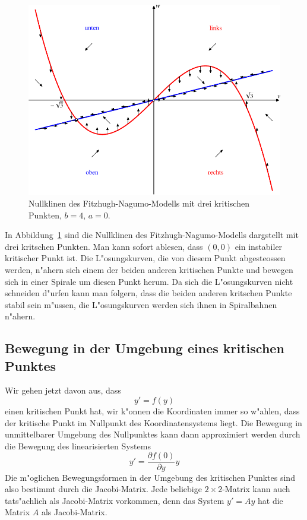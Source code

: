 \begin{beispiel}
\begin{figure}
\centering
\includegraphics{chapters/images/nullklinen-6.pdf}
\caption{Nullklinen des Fitzhugh-Nagumo-Modells mit drei kritischen Punkten,
$b=4$, $a=0$.
\label{geometrie:nullklinen-fh-2}}
\end{figure}
In Abbildung~\ref{geometrie:nullklinen-fh-2} sind die Nullklinen des
Fitzhugh-Nagumo-Modells dargstellt mit drei kritschen Punkten.
Man kann sofort ablesen, dass $(0,0)$ ein instabiler kritischer Punkt ist.
Die L"osungskurven, die von diesem Punkt abgesteossen werden, n"ahern sich
einem der beiden anderen kritischen Punkte und bewegen sich
in einer Spirale um diesen Punkt herum.
Da sich die L"osungskurven nicht schneiden d"urfen kann man folgern,
dass die beiden anderen kritschen Punkte stabil sein m"ussen,
die L"osungskurven werden sich ihnen in Spiralbahnen n"ahern.
\end{beispiel}

%
%
\subsection{Bewegung in der Umgebung eines kritischen Punktes\label{geometrie:umgebung-kritisch}}
Wir gehen jetzt davon aus, dass 
\[
y'=f(y)
\]
einen kritischen Punkt hat, wir k"onnen die Koordinaten immer so w"ahlen,
dass der kritische Punkt im Nullpunkt des Koordinatensystems liegt.
Die Bewegung in unmittelbarer Umgebung des Nullpunktes kann dann approximiert
werden durch die Bewegung des linearisierten Systems
\[
y'=\frac{\partial f(0)}{\partial y}y
\]
Die m"oglichen Bewegungsformen in der Umgebung des kritischen Punktes
sind also bestimmt durch die Jacobi-Matrix.
Jede beliebige $2\times 2$-Matrix kann auch tats"achlich als Jacobi-Matrix
vorkommen, denn das System
$
y'=Ay
$
hat die Matrix $A$ als Jacobi-Matrix.


